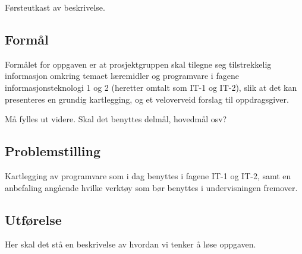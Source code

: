   {\color{red} Førsteutkast av beskrivelse. }




\subsection{Formål}
\label{sec:maal}
Formålet for oppgaven er at prosjektgruppen skal tilegne seg tilstrekkelig informasjon omkring temaet læremidler og programvare i fagene informasjonsteknologi 1 og 2 (heretter omtalt som IT-1 og IT-2), slik at det kan presenteres en grundig kartlegging, og et veloverveid forslag til oppdragsgiver. 

{\color{red} Må fylles ut videre. Skal det benyttes delmål, hovedmål osv?}

\subsection{Problemstilling}

Kartlegging av programvare som i dag benyttes i fagene IT-1 og IT-2, samt en anbefaling angående hvilke verktøy som bør benyttes i undervisningen fremover.


\subsection {Utførelse}

{\color{red}Her skal det stå en beskrivelse av hvordan vi tenker å løse oppgaven.}













